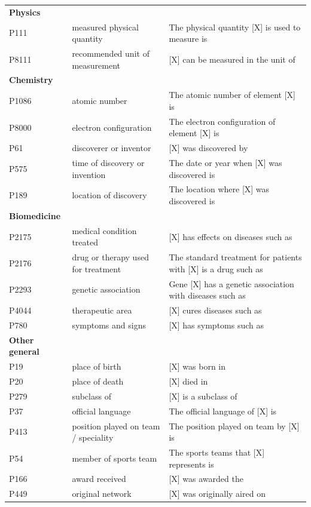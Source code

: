 \begin{table}[!ht]
{\begin{tabular}{l|l|l}
        \textbf{Physics} & ~ & ~ \\ 
        P111 & measured physical quantity & The physical quantity [X] is used to measure is \\ 
        P8111 & recommended unit of measurement & [X] can be measured in the unit of \\ \midrule
        \textbf{Chemistry} & ~ & ~ \\ 
        P1086 & atomic number & The atomic number of element [X] is \\ 
        P8000 & electron configuration & The electron configuration of element [X] is \\ 
        P61 & discoverer or inventor & [X] was discovered by \\ 
        P575 & time of discovery or invention & The date or year when [X] was discovered is \\ 
        P189 & location of discovery & The location where [X] was discovered is \\ \midrule
        \textbf{Biomedicine} & ~ & ~ \\ 
        P2175 & medical condition treated & [X] has effects on diseases such as \\ 
        P2176 & drug or therapy used for treatment & The standard treatment for patients with [X] is a drug such as \\ 
        P2293 & genetic association & Gene [X] has a genetic association with diseases such as \\ 
        P4044 & therapeutic area & [X] cures diseases such as \\ 
        P780 & symptoms and signs & [X] has symptoms such as \\ \midrule
        \textbf{Other general }& ~ & ~ \\ 
        P19 & place of birth & [X] was born in \\ 
        P20 & place of death & [X] died in \\ 
        P279 & subclass of & [X] is a subclass of \\ 
        P37 & official language & The official language of [X] is \\ 
        P413 & position played on team / speciality & The position played on team by [X] is \\ 
        P54 & member of sports team & The sports teams that [X] represents is \\ 
        P166 & award received & [X] was awarded the \\ 
        P449 & original network & [X] was originally aired on \\ 

\end{tabular}}
\end{table}

